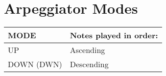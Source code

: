 \section{Arpeggiator Modes}
\begin{tabular}{|l|l|}
\hline
\rowcolor[HTML]{C0C0C0} 
MODE                                  & Notes played in order:                                                                                                                                                                        \\ \hline
UP                                    & Ascending                                                                                                                                                    \\ \hline
DOWN (DWN)                           &  Descending                                                                            \\ \hline


\end{tabular}
